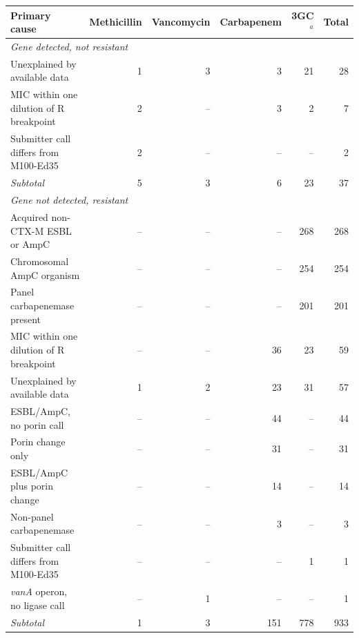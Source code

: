 \begin{tabular}{lrrrrr}
\hline\hline
Primary cause & Methicillin & Vancomycin & Carbapenem & 3GC$^{a}$ & Total \\
\hline
\multicolumn{6}{l}{\textit{Gene detected, not resistant}} \\
\quad Unexplained by available data & 1 & 3 & 3 & 21 & 28 \\
\quad MIC within one dilution of R breakpoint & 2 & -- & 3 & 2 & 7 \\
\quad Submitter call differs from M100-Ed35 & 2 & -- & -- & -- & 2 \\
\quad \textit{Subtotal} & 5 & 3 & 6 & 23 & 37 \\
\hline
\multicolumn{6}{l}{\textit{Gene not detected, resistant}} \\
\quad Acquired non-CTX-M ESBL or AmpC & -- & -- & -- & 268 & 268 \\
\quad Chromosomal AmpC organism & -- & -- & -- & 254 & 254 \\
\quad Panel carbapenemase present & -- & -- & -- & 201 & 201 \\
\quad MIC within one dilution of R breakpoint & -- & -- & 36 & 23 & 59 \\
\quad Unexplained by available data & 1 & 2 & 23 & 31 & 57 \\
\quad ESBL/AmpC, no porin call & -- & -- & 44 & -- & 44 \\
\quad Porin change only & -- & -- & 31 & -- & 31 \\
\quad ESBL/AmpC plus porin change & -- & -- & 14 & -- & 14 \\
\quad Non-panel carbapenemase & -- & -- & 3 & -- & 3 \\
\quad Submitter call differs from M100-Ed35 & -- & -- & -- & 1 & 1 \\
\quad \textit{vanA} operon, no ligase call & -- & 1 & -- & -- & 1 \\
\quad \textit{Subtotal} & 1 & 3 & 151 & 778 & 933 \\
\hline\hline
\end{tabular}
